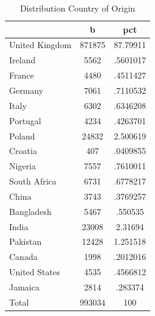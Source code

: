 \begin{table}[htbp]\centering
\def\sym#1{\ifmmode^{#1}\else\(^{#1}\)\fi}
\caption{Distribution Country of Origin}
\begin{tabular}{l*{1}{cc}}
\hline\hline
                    &           b&         pct\\
\hline
United Kingdom      &      871875&    87.79911\\
Ireland             &        5562&    .5601017\\
France              &        4480&    .4511427\\
Germany             &        7061&    .7110532\\
Italy               &        6302&    .6346208\\
Portugal            &        4234&    .4263701\\
Poland              &       24832&    2.500619\\
Croatia             &         407&    .0409855\\
Nigeria             &        7557&    .7610011\\
South Africa        &        6731&    .6778217\\
China               &        3743&    .3769257\\
Bangladesh          &        5467&     .550535\\
India               &       23008&     2.31694\\
Pakistan            &       12428&    1.251518\\
Canada              &        1998&    .2012016\\
United States       &        4535&    .4566812\\
Jamaica             &        2814&     .283374\\
Total               &      993034&         100\\
\hline\hline
\end{tabular}
\end{table}
